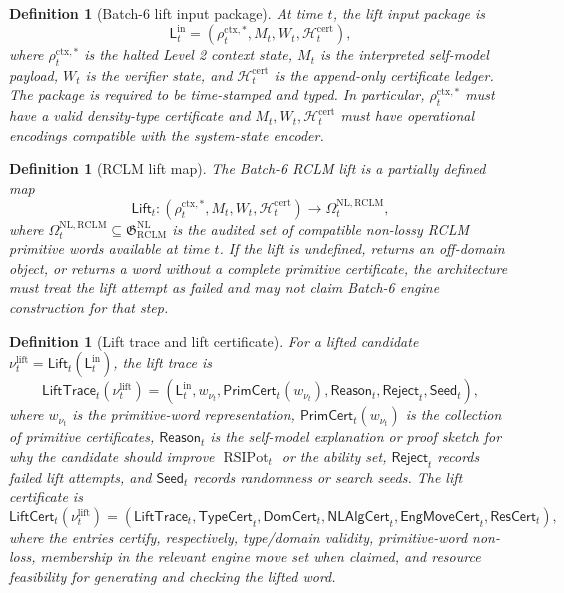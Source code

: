 \documentclass[11pt,a4paper]{article}
\newtheorem{definition}[theorem]{Definition}
\newcommand{\RCLM}{\mathrm{RCLM}}
\newcommand{\ctx}{\mathrm{ctx}}
\newcommand{\cert}{\mathrm{cert}}
\newcommand{\NL}{\mathrm{NL}}
\newcommand{\RSIPot}{\operatorname{RSIPot}}
\begin{document}
\begin{definition}[Batch-6 lift input package]
\label{def:rclm-lift-input-package}
At time \(t\), the lift input package is
\[
\mathsf L_t^{\mathrm{in}}
=
(\rho_t^{\ctx,*},M_t,W_t,\mathcal H_t^{\cert}),
\]
where \(\rho_t^{\ctx,*}\) is the halted Level 2 context state, \(M_t\) is the interpreted self-model payload, \(W_t\) is the verifier state, and \(\mathcal H_t^{\cert}\) is the append-only certificate ledger.  The package is required to be time-stamped and typed.  In particular, \(\rho_t^{\ctx,*}\) must have a valid density-type certificate and \(M_t,W_t,\mathcal H_t^{\cert}\) must have operational encodings compatible with the system-state encoder.
\end{definition}

\begin{definition}[RCLM lift map]
\label{def:rclm-lift-map}
The Batch-6 RCLM lift is a partially defined map
\[
\mathsf{Lift}_t:
(\rho_t^{\ctx,*},M_t,W_t,\mathcal H_t^{\cert})
\longrightarrow
\Omega_t^{\NL,\RCLM},
\]
where \(\Omega_t^{\NL,\RCLM}\subseteq\mathfrak G_{\RCLM}^{\NL}\) is the audited set of compatible non-lossy RCLM primitive words available at time \(t\).  If the lift is undefined, returns an off-domain object, or returns a word without a complete primitive certificate, the architecture must treat the lift attempt as failed and may not claim Batch-6 engine construction for that step.
\end{definition}

\begin{definition}[Lift trace and lift certificate]
\label{def:rclm-lift-certificate}
For a lifted candidate \(\nu_t^{\mathrm{lift}}=\mathsf{Lift}_t(\mathsf L_t^{\mathrm{in}})\), the lift trace is
\[
\mathsf{LiftTrace}_t(\nu_t^{\mathrm{lift}})
=
(\mathsf L_t^{\mathrm{in}},w_{\nu_t},\mathsf{PrimCert}_t(w_{\nu_t}),
\mathsf{Reason}_t,\mathsf{Reject}_t,\mathsf{Seed}_t),
\]
where \(w_{\nu_t}\) is the primitive-word representation, \(\mathsf{PrimCert}_t(w_{\nu_t})\) is the collection of primitive certificates, \(\mathsf{Reason}_t\) is the self-model explanation or proof sketch for why the candidate should improve \(\RSIPot_t\) or the ability set, \(\mathsf{Reject}_t\) records failed lift attempts, and \(\mathsf{Seed}_t\) records randomness or search seeds.  The lift certificate is
\[
\mathsf{LiftCert}_t(\nu_t^{\mathrm{lift}})
=
(\mathsf{LiftTrace}_t,\mathsf{TypeCert}_t,
\mathsf{DomCert}_t,
\mathsf{NLAlgCert}_t,
\mathsf{EngMoveCert}_t,
\mathsf{ResCert}_t),
\]
where the entries certify, respectively, type/domain validity, primitive-word non-loss, membership in the relevant engine move set when claimed, and resource feasibility for generating and checking the lifted word.
\end{definition}
\end{document}
